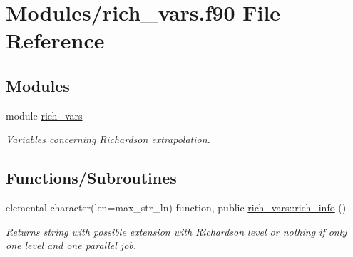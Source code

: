 \hypertarget{rich__vars_8f90}{}\section{Modules/rich\+\_\+vars.f90 File Reference}
\label{rich__vars_8f90}
\subsection*{Modules}
\begin{DoxyCompactItemize}
\item 
module \hyperlink{namespacerich__vars}{rich\+\_\+vars}
\begin{DoxyCompactList}\small\item\em Variables concerning Richardson extrapolation. \end{DoxyCompactList}\end{DoxyCompactItemize}
\subsection*{Functions/\+Subroutines}
\begin{DoxyCompactItemize}
\item 
elemental character(len=max\+\_\+str\+\_\+ln) function, public \hyperlink{namespacerich__vars_a4f54d3fc0ac510fc073220794ee4fa37}{rich\+\_\+vars\+::rich\+\_\+info} ()
\begin{DoxyCompactList}\small\item\em Returns string with possible extension with Richardson level or nothing if only one level and one parallel job. \end{DoxyCompactList}\end{DoxyCompactItemize}
